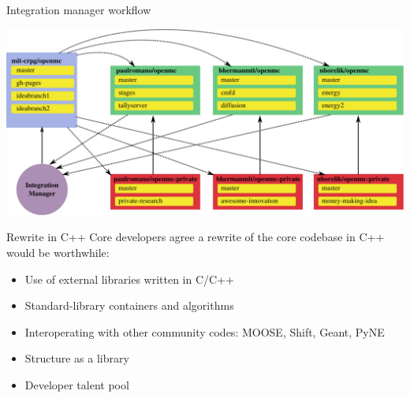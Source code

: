 \documentclass[noamssymb,svgnames]{beamer}
\begin{document}
\begin{frame}{Integration manager workflow}
  \begin{center}
    \includegraphics[width=\textwidth]{../images/integration-manager.pdf}
  \end{center}
\end{frame}

\begin{frame}{Rewrite in C++}
  Core developers agree a rewrite of the core codebase in C++ would be
  worthwhile:
  \begin{itemize}
  \item Use of external libraries written in C/C++
  \item Standard-library containers and algorithms
  \item Interoperating with other community codes: MOOSE, Shift, Geant, PyNE
  \item Structure as a library
  \item Developer talent pool
  \end{itemize}
\end{frame}
\end{document}
